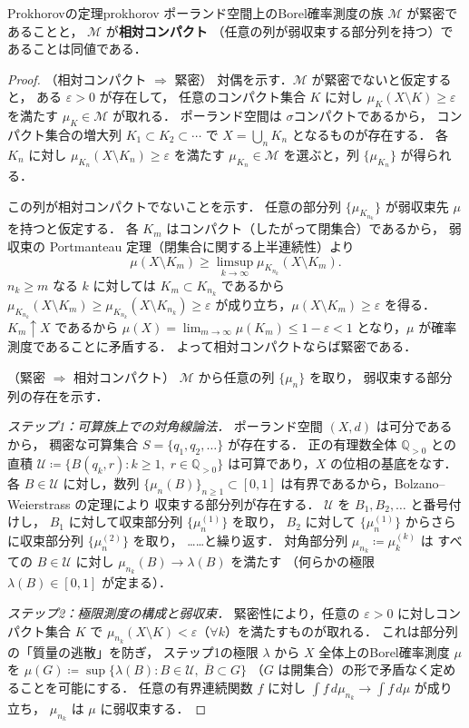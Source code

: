 \documentclass[uplatex, dvipdfmx]{jsarticle}
\begin{document}
\begin{theorem}{Prokhorovの定理}{prokhorov}
ポーランド空間上のBorel確率測度の族 $\mathcal{M}$ が緊密であることと，
$\mathcal{M}$ が\textbf{相対コンパクト}
（任意の列が弱収束する部分列を持つ）であることは同値である．
\end{theorem}

\begin{proof}
（相対コンパクト $\Rightarrow$ 緊密）
対偶を示す．$\mathcal{M}$ が緊密でないと仮定すると，
ある $\varepsilon>0$ が存在して，
任意のコンパクト集合 $K$ に対し $\mu_K(X\setminus K)\ge\varepsilon$
を満たす $\mu_K\in\mathcal{M}$ が取れる．
ポーランド空間は $\sigma$コンパクトであるから，
コンパクト集合の増大列 $K_1\subset K_2\subset\cdots$
で $X=\bigcup_n K_n$ となるものが存在する．
各 $K_n$ に対し $\mu_{K_n}(X\setminus K_n)\ge\varepsilon$ を満たす
$\mu_{K_n}\in\mathcal{M}$ を選ぶと，列 $\{\mu_{K_n}\}$ が得られる．

この列が相対コンパクトでないことを示す．
任意の部分列 $\{\mu_{K_{n_k}}\}$ が弱収束先 $\mu$ を持つと仮定する．
各 $K_m$ はコンパクト（したがって閉集合）であるから，
弱収束の Portmanteau 定理（閉集合に関する上半連続性）より
\[
  \mu(X\setminus K_m)
  \ge \limsup_{k\to\infty}\mu_{K_{n_k}}(X\setminus K_m).
\]
$n_k\ge m$ なる $k$ に対しては $K_m\subset K_{n_k}$ であるから
$\mu_{K_{n_k}}(X\setminus K_m)\ge\mu_{K_{n_k}}(X\setminus K_{n_k})\ge\varepsilon$
が成り立ち，$\mu(X\setminus K_m)\ge\varepsilon$ を得る．
$K_m\uparrow X$ であるから $\mu(X)=\lim_{m\to\infty}\mu(K_m)\le 1-\varepsilon<1$
となり，$\mu$ が確率測度であることに矛盾する．
よって相対コンパクトならば緊密である．

\medskip
（緊密 $\Rightarrow$ 相対コンパクト）
$\mathcal{M}$ から任意の列 $\{\mu_n\}$ を取り，
弱収束する部分列の存在を示す．

\textit{ステップ1：可算族上での対角線論法．}
ポーランド空間 $(X,d)$ は可分であるから，
稠密な可算集合 $S=\{q_1,q_2,\ldots\}$ が存在する．
正の有理数全体 $\mathbb{Q}_{>0}$ との直積
$\mathcal{U}\coloneqq\{B(q_k,r) : k\ge 1,\;r\in\mathbb{Q}_{>0}\}$
は可算であり，$X$ の位相の基底をなす．
各 $B\in\mathcal{U}$ に対し，数列 $\{\mu_n(B)\}_{n\ge 1}\subset[0,1]$
は有界であるから，Bolzano--Weierstrass の定理により
収束する部分列が存在する．
$\mathcal{U}$ を $B_1,B_2,\ldots$ と番号付けし，
$B_1$ に対して収束部分列 $\{\mu_{n}^{(1)}\}$ を取り，
$B_2$ に対して $\{\mu_{n}^{(1)}\}$ からさらに収束部分列 $\{\mu_{n}^{(2)}\}$ を取り，
……と繰り返す．
対角部分列 $\mu_{n_k}\coloneqq\mu_{k}^{(k)}$ は
すべての $B\in\mathcal{U}$ に対し $\mu_{n_k}(B)\to\lambda(B)$ を満たす
（何らかの極限 $\lambda(B)\in[0,1]$ が定まる）．

\textit{ステップ2：極限測度の構成と弱収束．}
緊密性により，任意の $\varepsilon>0$ に対しコンパクト集合 $K$ で
$\mu_{n_k}(X\setminus K)<\varepsilon$（$\forall k$）を満たすものが取れる．
これは部分列の「質量の逃散」を防ぎ，
ステップ1の極限 $\lambda$ から $X$ 全体上のBorel確率測度 $\mu$ を
$\mu(G)\coloneqq\sup\{\lambda(B) : B\in\mathcal{U},\;\overline{B}\subset G\}$
（$G$ は開集合）の形で矛盾なく定めることを可能にする．
任意の有界連続関数 $f$ に対し $\int f\,d\mu_{n_k}\to\int f\,d\mu$ が成り立ち，
$\mu_{n_k}$ は $\mu$ に弱収束する．
\end{proof}
\end{document}
